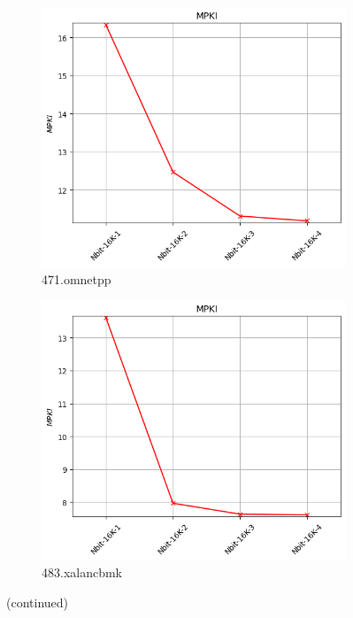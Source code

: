 \documentclass{article}
\begin{document}
\begin{figure}[H]
    \vspace{0.5cm} %

    \begin{subfigure}[b]{0.45\textwidth}
        \includegraphics[width=\textwidth]{figures/5_3/471.omnetpp.cslab_branch_preds_ref.out.png}
        \caption{471.omnetpp}
        \label{fig:plot15}
    \end{subfigure}
    \hfill
    \begin{subfigure}[b]{0.45\textwidth}
        \includegraphics[width=\textwidth]{figures/5_3/483.xalancbmk.cslab_branch_preds_ref.out.png}
        \caption{483.xalancbmk}
        \label{fig:plot16}
    \end{subfigure}

    \vspace{0.5cm} 

    \caption{(continued)}
    \label{fig:nbits_part3}
\end{figure}
\end{document}
